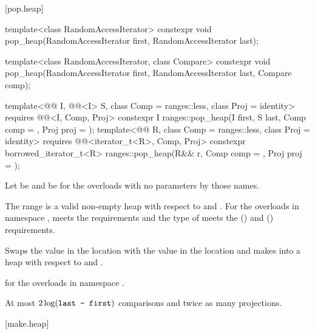 [pop.heap]{}

%
\begin{itemdecl}
template<class RandomAccessIterator>
  constexpr void pop_heap(RandomAccessIterator first, RandomAccessIterator last);

template<class RandomAccessIterator, class Compare>
  constexpr void pop_heap(RandomAccessIterator first, RandomAccessIterator last,
                          Compare comp);

template<@@ I, @@<I> S, class Comp = ranges::less,
         class Proj = identity>
  requires @@<I, Comp, Proj>
  constexpr I
    ranges::pop_heap(I first, S last, Comp comp = {}, Proj proj = {});
template<@@ R, class Comp = ranges::less, class Proj = identity>
  requires @@<iterator_t<R>, Comp, Proj>
  constexpr borrowed_iterator_t<R>
    ranges::pop_heap(R&& r, Comp comp = {}, Proj proj = {});
\end{itemdecl}

\begin{itemdescr}
\pnum
Let  be 
and  be 
for the overloads with no parameters by those names.

\pnum
\expects
The range 
is a valid non-empty heap with respect to  and .
For the overloads in namespace ,
 meets
the  requirements and
the type of  meets
the  () and
 () requirements.

\pnum
\effects
Swaps the value in the location 
with the value in the location
and makes
into a heap with respect to  and .

\pnum
\returns
{} for the overloads in namespace .

\pnum
\complexity
At most $2 \log(\texttt{last - first})$ comparisons and
twice as many projections.
\end{itemdescr}

[make.heap]{}

